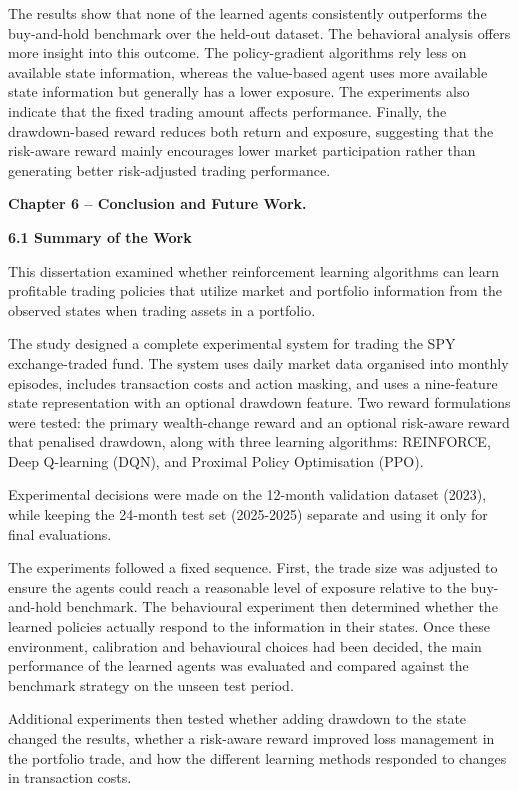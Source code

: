 The results show that none of the learned agents consistently
outperforms the buy-and-hold benchmark over the held-out dataset. The
behavioral analysis offers more insight into this outcome. The
policy-gradient algorithms rely less on available state information,
whereas the value-based agent uses more available state information but
generally has a lower exposure. The experiments also indicate that the
fixed trading amount affects performance. Finally, the drawdown-based
reward reduces both return and exposure, suggesting that the risk-aware
reward mainly encourages lower market participation rather than
generating better risk-adjusted trading performance.

\textbf{Chapter 6 -- Conclusion and Future Work.}

\textbf{6.1 Summary of the Work}

This dissertation examined whether reinforcement learning algorithms can
learn profitable trading policies that utilize market and portfolio
information from the observed states when trading assets in a portfolio.

The study designed a complete experimental system for trading the SPY
exchange-traded fund. The system uses daily market data organised into
monthly episodes, includes transaction costs and action masking, and
uses a nine-feature state representation with an optional drawdown
feature. Two reward formulations were tested: the primary wealth-change
reward and an optional risk-aware reward that penalised drawdown, along
with three learning algorithms: REINFORCE, Deep Q-learning (DQN), and
Proximal Policy Optimisation (PPO).

Experimental decisions were made on the 12-month validation dataset
(2023), while keeping the 24-month test set (2025-2025) separate and
using it only for final evaluations.

The experiments followed a fixed sequence. First, the trade size was
adjusted to ensure the agents could reach a reasonable level of exposure
relative to the buy-and-hold benchmark. The behavioural experiment then
determined whether the learned policies actually respond to the
information in their states. Once these environment, calibration and
behavioural choices had been decided, the main performance of the
learned agents was evaluated and compared against the benchmark strategy
on the unseen test period.

Additional experiments then tested whether adding drawdown to the state
changed the results, whether a risk-aware reward improved loss
management in the portfolio trade, and how the different learning
methods responded to changes in transaction costs.

